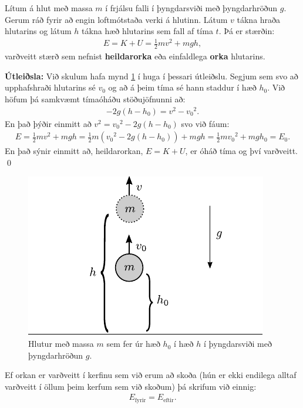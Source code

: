 \ifdefined \wholebook \else\documentclass[oneside]{book}\usepackage{EdlBook}\graphicspath{{figures/}}
\begin{document}
\begin{tcolorbox}
\begin{theorem}
Lítum á hlut með massa $m$ í frjálsu falli í þyngdarsviði með þyngdarhröðun $g$. Gerum ráð fyrir að engin loftmótstaða verki á hlutinn. Látum $v$ tákna hraða hlutarins og látum $h$ tákna hæð hlutarins sem fall af tíma $t$. Þá er stærðin: 
\begin{align*}
    E = K + U = \frac{1}{2}mv^2 + mgh,
\end{align*}
varðveitt stærð sem nefnist \textbf{heildarorka} eða einfaldlega \textbf{orka} hlutarins.
\end{theorem}
\end{tcolorbox}

\textbf{Útleiðsla:} Við skulum hafa mynd \ref{fig:stoduorka} í huga í þessari útleiðslu. Segjum sem svo að upphafshraði hlutarins sé $v_0$ og að á þeim tíma sé hann staddur í hæð $h_0$. Við höfum þá samkvæmt tímaóháðu stöðujöfnunni að:
\begin{align*}
    -2g(h-h_0) = v^2 - {v_0}^2.
\end{align*}
En það þýðir einmitt að $v^2 = {v_0}^2 - 2g(h-h_0)$ svo við fáum:
\begin{align*}
    E = \frac{1}{2}mv^2 + mgh = \frac{1}{2}m\left( {v_0}^2 -2g(h-h_0) \right) + mgh = \frac{1}{2}m{v_0}^2 + mgh_0 = E_0.
\end{align*}
En það sýnir einmitt að, heildarorkan, $E = K + U$, er óháð tíma og því varðveitt. \qed

\begin{figure}[H]
    \centering
    \includegraphics{figures/stoduorka.pdf}
    \caption{Hlutur með massa $m$ sem fer úr hæð $h_0$ í hæð $h$ í þyngdarsviði með þyngdarhröðun $g$.}
    \label{fig:stoduorka}
\end{figure}

Ef orkan er varðveitt í kerfinu sem við erum að skoða (hún er ekki endilega alltaf varðveitt í öllum þeim kerfum sem við skoðum) þá skrifum við einnig:
\begin{align*}
    E_{\text{fyrir}} = E_{\text{eftir}}.
\end{align*}
\end{document}
